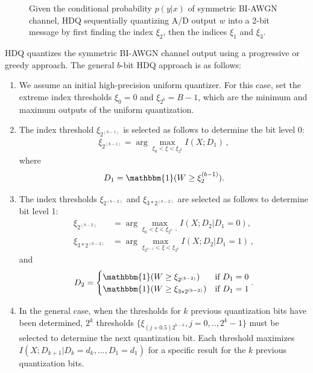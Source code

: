 \documentclass [PhD] {uclathes}
\begin{document}
\begin{figure}
	\centering
	
	\caption{Given the conditional probability $p(y|x)$ of symmetric BI-AWGN channel, HDQ sequentially quantizing A/D output $w$ into a 2-bit message by first finding the index $\xi_2$, then the indices $\xi_1$ and $\xi_3$.}
	\label{fig: HDQ}
\end{figure}

HDQ quantizes the symmetric BI-AWGN channel output using a  progressive \cite{nathan-hdq} or greedy approach.  
The general $b$-bit HDQ approach is as follows:
\begin{enumerate}
    \item We assume an initial high-precision uniform quantizer.  For this case, set the extreme index thresholds  $\xi_0=0$ and $\xi_{2^b}=B-1$, which are the minimum and maximum outputs of the uniform quantization.  
    \item The index threshold $\xi_{2^{(b-1)}}$ is selected as follows to determine the bit level 0:
    \begin {align}
    \xi_{2^{(b-1)}} = \arg \max_{\xi_0<\xi<\xi_{2^b}} I(X;D_1)\, , 
    \end{align}
where 
\begin{equation} 
D_1 = \mathbbm{1}(W\geq \xi_2^{(b-1)}).
\end{equation}

\item The index thresholds  $\xi_{2^{(b-2)}}$ and $\xi_{3*2^{(b-2)}}$ are selected as follows to determine bit level 1:
    \begin {align}
    \xi_{2^{(b-2)}} &= \arg \max_{\xi_0<\xi<\xi_{2^{b-1}}} I(X;D_2| D_1=0), \\ 
    \xi_{3*2^{(b-2)}} &= \arg \max_{\xi_{2^{b-1}}<\xi<\xi_{2^b}} I(X;D_2| D_1=1)\, ,
    \end{align}
    and 
\begin{equation} 
D_2 = \begin{cases} 
\mathbbm{1}(W \geq \xi_{2^{(b-2)}}) & \text{if } D_1=0 \\
\mathbbm{1}(W \geq \xi_{3*2^{(b-2)}}) & \text{if } D_1=1 \\
\end{cases}.
\end{equation}

\item In the general case, when the thresholds for $k$ previous quantization bits have been determined, $2^k$ thresholds $\{\xi_{(j+0.5)2^{b-k}}, j=0,..,2^{k}-1\}$ must be selected to determine the next quantization bit.  Each threshold maximizes $I(X;D_{k+1}|D_k=d_k, \ldots,D_1=d_1 )$ for a specific result for the $k$ previous quantization bits. 
\end{enumerate}
\end{document}
